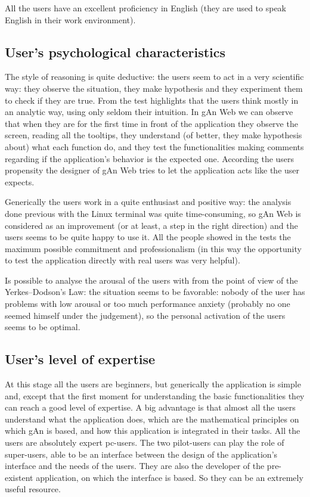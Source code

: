 All the users have an excellent proficiency in English (they are used to speak English in their work environment). 

\subsection{User's psychological characteristics }
The style of reasoning is quite deductive: the users seem to act in a very scientific way: they observe the situation, they make hypothesis and they experiment them to check if they are true. From the test highlights that the users think mostly in an analytic way, using only seldom their intuition. In gAn Web we can observe that when they are for the first time in front of the application they observe the screen, reading all the tooltips, they understand (of better, they make hypothesis about) what each function do, and they test the functionalities making comments regarding if the application's behavior is the expected one. According the users  propensity the designer of gAn Web tries to let the application acts like the user expects.   

Generically the users work in a quite enthusiast and positive way: the analysis done previous with the Linux terminal was quite time-consuming, so gAn Web is considered as an improvement (or at least, a step in the right direction) and the users seems to be quite happy to use it. All the people showed in the tests the maximum possible commitment and professionalism (in this way the opportunity to test the application directly with real users was very helpful).

Is possible to analyse the arousal of the users with from the point of view of the Yerkes–Dodson's Law: the situation seems to be favorable: nobody of the user 
has problems with low arousal or too much performance anxiety (probably no one seemed himself under the judgement), so the personal activation of the users seems to be optimal.

\subsection{User's level of expertise }
At this stage all the users are beginners, but generically the application is simple and, except that the first moment for understanding the basic functionalities they can reach a good level of expertise. A big advantage is that almost all the users understand what the application does, which are the mathematical principles on which gAn is based, and how this application is integrated in their tasks.   
All the users are absolutely expert pc-users.
The two pilot-users can play the role of super-users, able to be an interface between the design of the application's interface and the needs of the users. They are also the developer of the pre-existent application, on which the interface is based. So they can be an extremely useful resource.  

